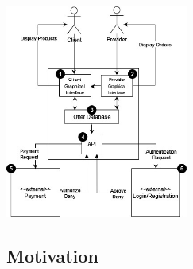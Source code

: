 \begin{table}[H]
	\begin{minipage}{0.45\linewidth}
		\centering
		\includegraphics[width=6cm]{assets/risk_technical_context.jpg}
		\label{ }
	\end{minipage}
\end{table}

\subsection{Motivation}

